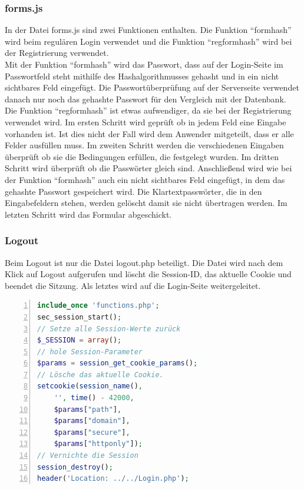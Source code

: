 \subsubsection{forms.js}
In der Datei forms.js sind zwei Funktionen enthalten. Die Funktion "`formhash"' wird beim regulären Login verwendet und die Funktion "`regformhash"' wird bei der Registrierung verwendet. \\
Mit der Funktion "`formhash"' wird das Passwort, dass auf der Login-Seite im Passwortfeld steht mithilfe des Hashalgorithmusses gehasht und in ein nicht sichtbares Feld eingefügt. Die Passwortüberprüfung auf der Serverseite verwendet danach nur noch das gehashte Passwort für den Vergleich mit der Datenbank.\\
Die Funktion "`regformhash"' ist etwas aufwendiger, da sie bei der Registrierung verwendet wird. Im ersten Schritt wird geprüft ob in jedem Feld eine Eingabe vorhanden ist. Ist dies nicht der Fall wird dem Anwender mitgeteilt, dass er alle Felder ausfüllen muss. Im zweiten Schritt werden die verschiedenen Eingaben überprüft ob sie die Bedingungen erfüllen, die festgelegt wurden. Im dritten Schritt wird überprüft ob die Passwörter gleich sind. Anschließend wird wie bei der Funktion "`formhash"' auch ein nicht sichtbares Feld eingefügt, in dem das gehashte Passwort gespeichert wird. Die Klartextpasswörter, die in den Eingabefeldern stehen, werden gelöscht damit sie nicht übertragen werden. Im letzten Schritt wird das Formular abgeschickt.

\subsubsection{Logout}
Beim Logout ist nur die Datei logout.php beteiligt. Die Datei wird nach dem Klick auf Logout aufgerufen und löscht die Session-ID, das aktuelle Cookie und beendet die Sitzung. Als letztes wird auf die Login-Seite weitergeleitet.

\begin{lstlisting}[caption=Inhalt der logout.php,frame=single,numbers=left,language=PHP]
include_once 'functions.php';
sec_session_start();
// Setze alle Session-Werte zurück
$_SESSION = array();
// hole Session-Parameter
$params = session_get_cookie_params();
// Lösche das aktuelle Cookie.
setcookie(session_name(),
    '', time() - 42000,
    $params["path"],
    $params["domain"],
    $params["secure"],
    $params["httponly"]);
// Vernichte die Session
session_destroy();
header('Location: ../../Login.php');
\end{lstlisting}


